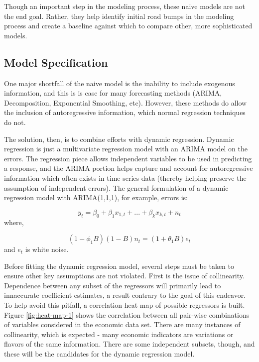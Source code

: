 \documentclass[12pt,letterpaper,toc=flat,oneside]{report}
\theoremstyle{definition}
\theoremstyle{definition}
\theoremstyle{definition}
\theoremstyle{remark}
\begin{document}
Though an important step in the modeling process, these naive models are
not the end goal. Rather, they help identify initial road bumps in the
modeling process and create a baseline against which to compare other,
more sophisticated models.

\hypertarget{model-specification}{%
\subsection{Model Specification}\label{model-specification}}

One major shortfall of the naive model is the inability to include
exogenous information, and this is is case for many forecasting methods
(ARIMA, Decomposition, Exponential Smoothing, etc). However, these
methods do allow the inclusion of autoregressive information, which
normal regression techniques do not.

The solution, then, is to combine efforts with dynamic regression.
Dynamic regression is just a multivariate regression model with an ARIMA
model on the errors. The regression piece allows independent variables
to be used in predicting a response, and the ARIMA portion helps capture
and account for autoregressive information which often exists in
time-series data (thereby helping preserve the assumption of independent
errors). The general formulation of a dynamic regression model with
ARIMA(1,1,1), for example, errors is:

\[ y_t = \beta_0 + \beta_1x_{1,t} + ... + \beta_kx_{k,t} + n_t\] where,

\[ (1-\phi_1B)(1-B)n_t = (1+\theta_1B)e_t \] and \(e_t\) is white noise.

Before fitting the dynamic regression model, several steps must be taken
to ensure other key assumptions are not violated. First is the issue of
collinearity. Dependence between any subset of the regressors will
primarily lead to innaccurate coefficient estimates, a result contrary
to the goal of this endeavor. To help avoid this pitfall, a correlation
heat map of possible regressors is built. Figure \ref{fig:heat-map-1}
shows the correlation between all pair-wise combinations of variables
considered in the economic data set. There are many instances of
collinearity, which is expected - many economic indicators are
variations or flavors of the same information. There are some
independent subsets, though, and these will be the candidates for the
dynamic regression model.
\end{document}

